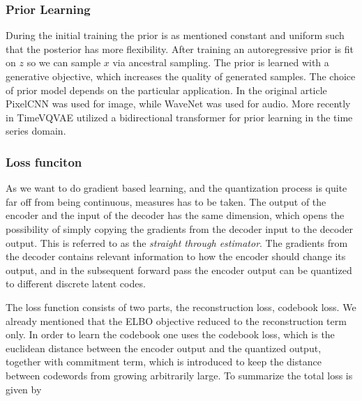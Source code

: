 \documentclass[../../thesis.tex]{subfiles}
\begin{document}


\subsubsection{Prior Learning}
During the initial training the prior is as mentioned constant and uniform such that the posterior has more flexibility. After training an autoregressive prior is fit on $z$ so we can sample $x$ via ancestral sampling. The prior is learned with a generative objective, which increases the quality of generated samples. The choice of prior model depends on the particular application. In the original article PixelCNN \cite{oord2016pixel} was used for image, while WaveNet \cite{oord2016wavenet} was used for audio. More recently in TimeVQVAE \cite{TimeVQVAE} utilized a bidirectional transformer \cite{chang2022maskgit} for prior learning in the time series domain. 

\subsubsection{Loss funciton}
\label{section:VQVAELoss}
As we want to do gradient based learning, and the quantization process is quite far off from being continuous, measures has to be taken. The output of the encoder and the input of the decoder has the same dimension, which opens the possibility of simply copying the gradients from the decoder input to the decoder output. This is referred to as the \textit{straight through estimator}. The gradients from the decoder contains relevant information to how the encoder should change its output, and in the subsequent forward pass the encoder output can be quantized to different discrete latent codes.\newline

The loss function consists of two parts, the reconstruction loss, codebook loss. We already mentioned that the ELBO objective reduced to the reconstruction term only. In order to learn the codebook one uses the codebook loss, which is the euclidean distance between the encoder output and the quantized output, together with commitment term, which is introduced to keep the distance between codewords from growing arbitrarily large. To summarize the total loss is given by
\end{document}
